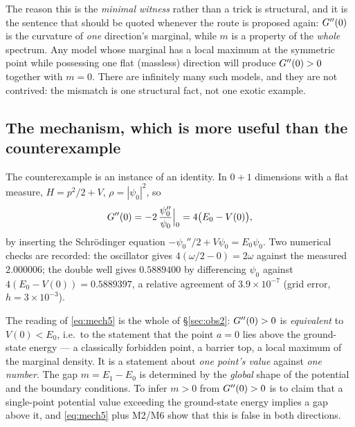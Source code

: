 The reason this is the \emph{minimal witness} rather than a trick is structural, and it is the
sentence that should be quoted whenever the route is proposed again: $G''(0)$ is the curvature of
\emph{one} direction's marginal, while $m$ is a property of the \emph{whole} spectrum. Any model
whose marginal has a local maximum at the symmetric point while possessing one flat (massless)
direction will produce $G''(0)>0$ together with $m=0$. There are infinitely many such models, and
they are not contrived: the mismatch is one structural fact, not one exotic example.


\subsection{The mechanism, which is more useful than the counterexample}

The counterexample is an instance of an identity. In $0+1$ dimensions with a flat measure,
$H=p^{2}/2+V$, $\rho=|\psi_0|^{2}$, so
\begin{equation}
G''(0)=-2\,\frac{\psi_0''}{\psi_0}\Big|_{0}=4\bigl(E_0-V(0)\bigr),
\label{eq:mech5}
\end{equation}
by inserting the Schr\"odinger equation $-\psi_0''/2+V\psi_0=E_0\psi_0$. \LT{} Two numerical
checks are recorded: the oscillator gives $4(\omega/2-0)=2\omega$ against the measured
$2.000006$; the double well gives $0.5889400$ by differencing $\psi_0$ against
$4(E_0-V(0))=0.5889397$, a relative agreement of $3.9\times10^{-7}$ (grid error, $h=3\times10^{-3}$).

The reading of \eqref{eq:mech5} is the whole of \S\ref{sec:obs2}: $G''(0)>0$ is \emph{equivalent} to
$V(0)<E_0$, i.e.\ to the statement that the point $a=0$ lies above the ground-state energy --- a
classically forbidden point, a barrier top, a local maximum of the marginal density. It is a
statement about \emph{one point's value} against \emph{one number}. The gap $m=E_1-E_0$ is
determined by the \emph{global} shape of the potential and the boundary conditions. To infer
$m>0$ from $G''(0)>0$ is to claim that a single-point potential value exceeding the ground-state
energy implies a gap above it, and \eqref{eq:mech5} plus M2/M6 show that this is false in both
directions.


